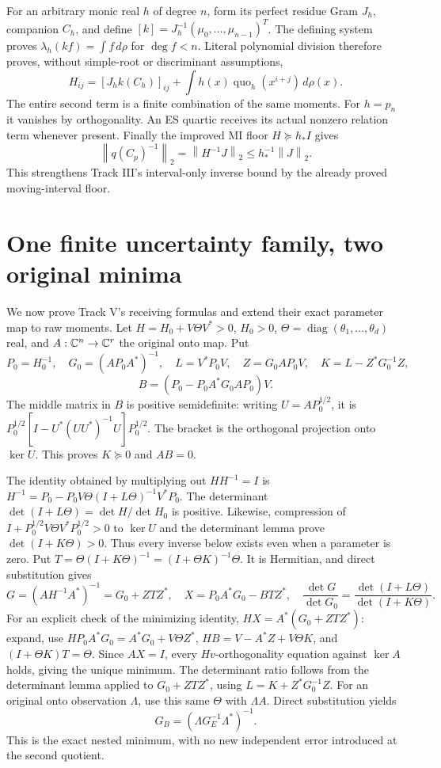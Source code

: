\documentclass[11pt]{article}
\newcommand{\norm}[1]{\left\lVert#1\right\rVert}
\begin{document}
For an arbitrary monic real \(h\) of degree \(n\), form its perfect
residue Gram \(J_h\), companion \(C_h\), and define
\([k]=J_h^{-1}(\mu_0,\ldots,\mu_{n-1})^T\).
The defining system proves
\(\lambda_h(kf)=\int f\,d\rho\) for \(\deg f<n\).
Literal polynomial division therefore proves, without simple-root
or discriminant assumptions,
\begin{equation}\tag{NI13}
 H_{ij}=[J_hk(C_h)]_{ij}
       +\int h(x)\operatorname{quo}_h(x^{i+j})\,d\rho(x).
\end{equation}
The entire second term is a finite combination of the same moments.
For \(h=p_n\) it vanishes by orthogonality. An ES quartic receives
its actual nonzero relation term whenever present.
Finally the improved MI floor \(H\succeq h_*I\) gives
\begin{equation}\tag{NI14}
 \norm{q(C_p)^{-1}}_2=\norm{H^{-1}J}_2
 \le h_*^{-1}\norm J_2 .
\end{equation}
This strengthens Track III's interval-only inverse bound by the
already proved moving-interval floor.

\section{One finite uncertainty family, two original minima}
We now prove Track V's receiving formulas and extend their exact
parameter map to raw moments. Let
\(H=H_0+V\Theta V^*>0\), \(H_0>0\),
\(\Theta=\operatorname{diag}(\theta_1,\ldots,\theta_d)\) real,
and \(A:\mathbb C^n\to\mathbb C^r\) the original onto map. Put
\[
 P_0=H_0^{-1},\quad G_0=(AP_0A^*)^{-1},\quad
 L=V^*P_0V,\quad Z=G_0AP_0V,\quad
 K=L-Z^*G_0^{-1}Z,
\]
\[
 B=(P_0-P_0A^*G_0AP_0)V .
\]
The middle matrix in \(B\) is positive semidefinite: writing
\(U=AP_0^{1/2}\), it is
\(P_0^{1/2}[I-U^*(UU^*)^{-1}U]P_0^{1/2}\).
The bracket is the orthogonal projection onto \(\ker U\).
This proves \(K\succeq0\) and \(AB=0\).

The identity obtained by multiplying out \(HH^{-1}=I\) is
\(H^{-1}=P_0-P_0V\Theta(I+L\Theta)^{-1}V^*P_0\).
The determinant \(\det(I+L\Theta)=\det H/\det H_0\) is positive.
Likewise, compression of
\(I+P_0^{1/2}V\Theta V^*P_0^{1/2}>0\) to \(\ker U\)
and the determinant lemma prove \(\det(I+K\Theta)>0\).
Thus every inverse below exists even when a parameter is zero.
Put \(T=\Theta(I+K\Theta)^{-1}=(I+\Theta K)^{-1}\Theta\).
It is Hermitian, and direct substitution gives
\begin{equation}\tag{NI15}
 G=(AH^{-1}A^*)^{-1}=G_0+ZTZ^*,\quad
 X=P_0A^*G_0-BTZ^*,\quad
 \frac{\det G}{\det G_0}=\frac{\det(I+L\Theta)}{\det(I+K\Theta)}.
\end{equation}
For an explicit check of the minimizing identity,
\(HX=A^*(G_0+ZTZ^*)\): expand, use
\(H P_0A^*G_0=A^*G_0+V\Theta Z^*\),
\(HB=V-A^*Z+V\Theta K\), and
\((I+\Theta K)T=\Theta\).
Since \(AX=I\), every \(Hv\)-orthogonality equation against
\(\ker A\) holds, giving the unique minimum.
The determinant ratio follows from the determinant lemma applied to
\(G_0+ZTZ^*\), using
\(L=K+Z^*G_0^{-1}Z\).
For an original onto observation \(\Lambda\), use this same
\(\Theta\) with \(\Lambda A\). Direct substitution yields
\[
 G_B=(\Lambda G_E^{-1}\Lambda^*)^{-1}.
\]
This is the exact nested minimum, with no new independent error
introduced at the second quotient.
\end{document}
